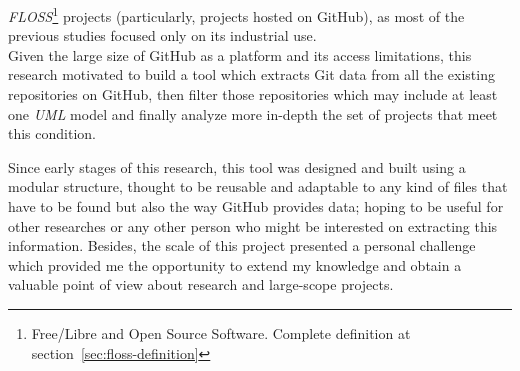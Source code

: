\documentclass[a4paper, 12pt]{book}
\begin{document}
\emph{FLOSS}\footnote{Free/Libre and Open Source Software. Complete definition at section~\ref{sec:floss-definition}} projects
(particularly, projects hosted on GitHub), as most of the previous studies focused only on its industrial use.\\
Given the large size of GitHub as a platform and its access limitations, this research motivated to build a tool which extracts
Git data from all the existing repositories on GitHub, then filter those repositories which may include at least one
\emph{UML} model and finally analyze more in-depth the set of projects that meet this condition.\par
Since early stages of this research, this tool was designed and built using a modular structure, thought to be reusable
and adaptable to any kind of files that have to be found but also the way GitHub provides data; hoping to be useful
for other researches or any other person who might be interested on extracting this information. Besides, the scale of this project
presented a personal challenge which provided me the opportunity to extend my knowledge and obtain a valuable point of
view about research and large-scope projects.
\end{document}
